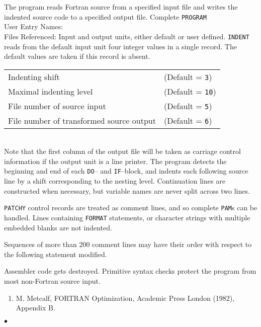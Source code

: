                        
                      
\Submitter{}                              
The program reads Fortran source from a specified input file
and writes the indented source code to a specified output file.
\Structure
Complete {\tt PROGRAM}\\
User Entry Names: \\
Files Referenced: Input and output units, either default or user defined.
\Usage
{\tt INDENT} reads from the default input unit four integer values in a
single record. The default values are taken if this record is absent.
\\[1mm]
\begin{tabular}{@{\hspace*{5mm}}ll}
Indenting shift & (Default = {\tt 3}) \\
Maximal indenting level & (Default = {\tt 10}) \\
File number of source input & (Default = {\tt 5}) \\
File number of transformed source output & (Default = {\tt 6})
\end{tabular} \\[2mm]
Note that the first column of the output file will be taken as carriage
control information if the output unit is a line printer.
\Method
The program detects the beginning and end of each
{\tt DO}-- and {\tt IF}--block, and indents each following source line by
a shift corresponding to the nesting level. Continuation lines are
constructed when necessary, but variable names are never split
across two lines.
\par
{\tt PATCHY} control records are treated as comment lines, and so
complete {\tt PAM}s can be handled.
\Restrict
Lines containing {\tt FORMAT} statements, or character
strings with multiple embedded blanks are not indented.
\par
Sequences of more than 200 comment lines may have
their order with respect to the following statement modified.
\par
Assembler code gets destroyed.
\Errorh
Primitive syntax checks protect the program from most non-Fortran
source input.
\Refer
\begin{enumerate}
\item M. Metcalf, FORTRAN Optimization, Academic Press London (1982),
Appendix B.
\end{enumerate}
$\bullet$

